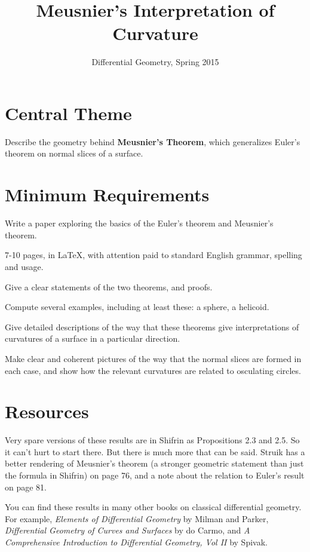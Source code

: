 \documentclass[12pt]{amsart}
\begin{document}
\title{Meusnier's Interpretation of Curvature}
\author{Differential Geometry, Spring 2015}

\maketitle

\section*{Central Theme}

Describe the geometry behind \textbf{Meusnier's Theorem}, which generalizes Euler's theorem on normal slices of a surface.

\section*{Minimum Requirements}

Write a paper exploring the basics of the Euler's theorem and Meusnier's theorem. 
\begin{compactitem}
\item 7-10 pages, in \LaTeX, with attention paid to standard English grammar, spelling and usage.
\item Give a clear statements of the two theorems, and proofs.
\item Compute several examples, including at least these: a sphere, a helicoid.
\item Give detailed descriptions of the way that these theorems give interpretations of 
curvatures of a surface in a particular direction.
\item Make clear and coherent pictures of the way that the normal slices are formed in each case, and show how the relevant curvatures are related to osculating circles.
\end{compactitem}

\section*{Resources}

Very spare versions of these results are in Shifrin as Propositions 2.3 and 2.5. So it can't hurt to start there. But there is much more that can be said. Struik has a better rendering of Meusnier's theorem (a stronger geometric statement than just the formula in Shifrin) on page 76, and a note about the relation to Euler's result on page 81.

You can find these results in many other books on classical differential geometry. For example, \emph{Elements of Differential Geometry} by Milman and Parker, \emph{Differential Geometry of Curves and Surfaces} by do Carmo, and \emph{A Comprehensive Introduction to Differential Geometry, Vol II} by Spivak.
\end{document}
